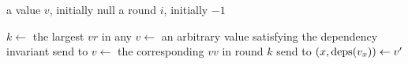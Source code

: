 \newcommand{\nullbot}{\textsf{null}}

\begin{algorithm*}[ht]
  \caption{%
    Majority Commit \BPaxos{} Proposer. Pseudocode for initiating recovery and
    handling  messages is ommitted because it is identical to
    the pseudocode in .
  }%
  \begin{algorithmic}[1]
    \GlobalState a value $v$, initially \nullbot{}
    \GlobalState a round $i$, initially $-1$

      \State $k \gets$ the largest $vr$ in any 
       
        \State $v \gets$ an arbitrary value satisfying the dependency invariant
        \State send  to 
       
        \State $v \gets$ the corresponding $vv$ in round $k$
        \State send  to 
       
        \State $(x, \text{deps}(v_x)) \gets v'$


\end{algorithmic}
\end{algorithm*}
